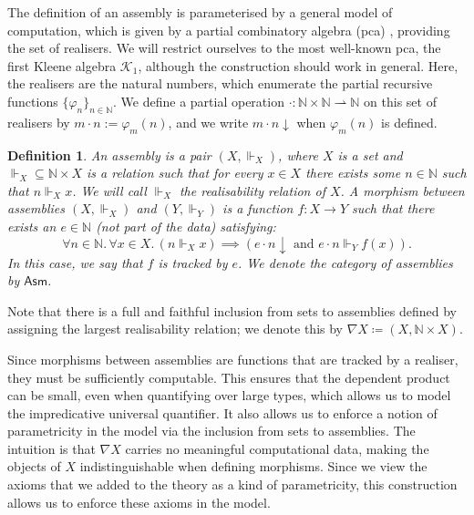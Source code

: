 \documentclass[10pt,a4paper]{article}
\newtheorem{definition}[theorem]{Definition}
\theoremstyle{definition}
\theoremstyle{remark}
\renewcommand{\.}{.\,} %
\renewcommand{\:}{:} %
\newcommand{\bN}{\mathbb{N}}
\newcommand{\0}{\mathbf{0}}
\newcommand{\1}{\mathbf{1}}
\newcommand\<\langle
\renewcommand\>\rangle
\newcommand{\Asm}{\mathsf{Asm}}
\theoremstyle{remark}
\begin{document}
The definition of an assembly is parameterised by a general model of computation, which is given by a partial combinatory algebra (pca) \cite{feferman}, providing the set of realisers. We will restrict ourselves to the most well-known pca, the first Kleene algebra \( \mathcal{K}_1 \), although the construction should work in general.
Here, the realisers are the natural numbers, which enumerate the partial recursive functions \(\{\varphi_n\}_{n \in \bN} \).  We define a partial operation \( \cdot : \bN \times \bN \rightharpoonup \bN \) on this set of realisers by \( m \cdot n := \varphi_m(n) \), and we write \( {m \cdot n \downarrow} \) when \( \varphi_m(n) \) is defined. 
\begin{definition}
    An \emph{assembly} is a pair $(X, \Vdash_X)$, where $X$ is a set and ${\Vdash_X} \subseteq \bN \times X$ is a relation such that for every \( x \in X \) there exists some \( n \in \bN \) such that \( n \Vdash_X x \). We will call \( \Vdash_X \) the \emph{realisability} relation of \( X \). A morphism between assemblies \((X, \Vdash_X)\) and \( (Y, \Vdash_Y) \) is a function \( f : X \to  Y \) such that there exists an \( e \in \bN \) (not part of the data) satisfying:
\[
    \forall n \in \bN.\,\forall x \in X.\,(n \Vdash_X x) \implies (e \cdot n \downarrow \mbox{ and } e \cdot n \Vdash_Y f(x)).
\] 
In this case, we say that \(f\) is \emph{tracked} by \(e\). We denote the category of assemblies by \( \Asm \).
\end{definition}
Note that there is a full and faithful inclusion from sets to assemblies defined by assigning the largest realisability relation; we denote this by \( \nabla X \coloneqq (X, \bN \times X) \). 

Since morphisms between assemblies are functions that are tracked by a realiser, they must be sufficiently computable.
This ensures that the dependent product can be small, even when quantifying over large types, which allows us to model the impredicative universal quantifier.
It also allows us to enforce a notion of parametricity in the model via the inclusion from sets to assemblies. The intuition is that \( \nabla X \) carries no meaningful computational data, making the objects of \( X \) indistinguishable when defining morphisms. Since we view the axioms that we added to the theory as a kind of parametricity, this construction allows us to enforce these axioms in the model. 
\end{document}

